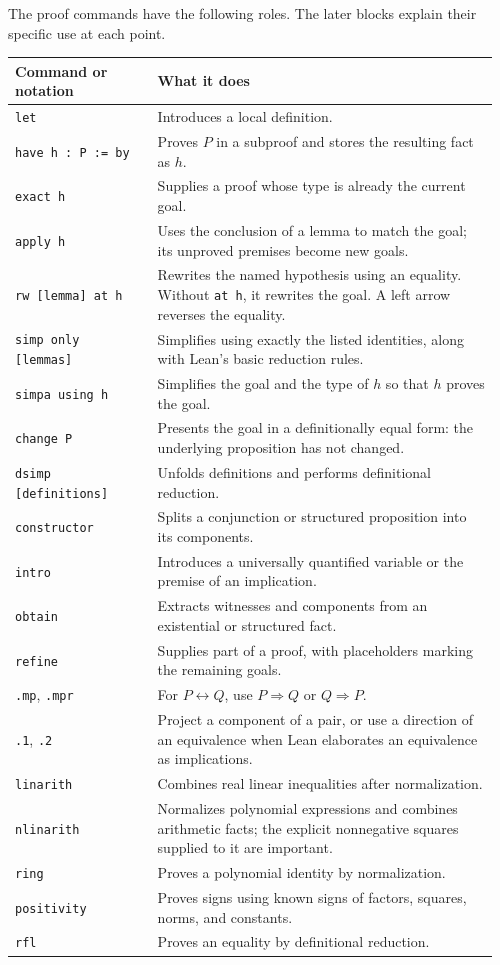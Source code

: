 \documentclass[11pt,a4paper]{article}
\newcommand{\lean}[1]{\ifmmode\text{\nolinkurl{#1}}\else\nolinkurl{#1}\fi}
\begin{document}
The proof commands have the following roles. The later blocks explain their
specific use at each point.
\begin{longtable}{@{}p{0.29\linewidth}p{0.67\linewidth}@{}}
\toprule
Command or notation & What it does\\
\midrule
\endhead
\lean{let} & Introduces a local definition.\\
\lean{have h : P := by} & Proves $P$ in a subproof and stores the resulting fact as $h$.\\
\lean{exact h} & Supplies a proof whose type is already the current goal.\\
\lean{apply h} & Uses the conclusion of a lemma to match the goal; its unproved
premises become new goals.\\
\lean{rw [lemma] at h} & Rewrites the named hypothesis using an equality.
Without \lean{at h}, it rewrites the goal. A left arrow reverses the equality.\\
\lean{simp only [lemmas]} & Simplifies using exactly the listed identities,
along with Lean's basic reduction rules.\\
\lean{simpa using h} & Simplifies the goal and the type of $h$ so that $h$ proves the goal.\\
\lean{change P} & Presents the goal in a definitionally equal form: the underlying
proposition has not changed.\\
\lean{dsimp [definitions]} & Unfolds definitions and performs definitional reduction.\\
\lean{constructor} & Splits a conjunction or structured proposition into its components.\\
\lean{intro} & Introduces a universally quantified variable or the premise of an implication.\\
\lean{obtain} & Extracts witnesses and components from an existential or structured fact.\\
\lean{refine} & Supplies part of a proof, with placeholders marking the remaining goals.\\
\lean{.mp}, \lean{.mpr} & For $P\leftrightarrow Q$, use $P\Rightarrow Q$ or $Q\Rightarrow P$.\\
\lean{.1}, \lean{.2} & Project a component of a pair, or use a direction of an equivalence
when Lean elaborates an equivalence as implications.\\
\lean{linarith} & Combines real linear inequalities after normalization.\\
\lean{nlinarith} & Normalizes polynomial expressions and combines arithmetic facts;
the explicit nonnegative squares supplied to it are important.\\
\lean{ring} & Proves a polynomial identity by normalization.\\
\lean{positivity} & Proves signs using known signs of factors, squares, norms, and constants.\\
\lean{rfl} & Proves an equality by definitional reduction.\\
\bottomrule
\end{longtable}
\end{document}
